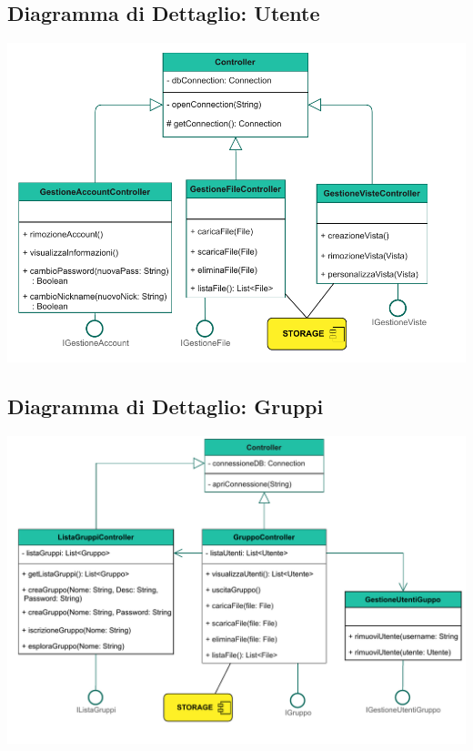 \subsection*{Diagramma di Dettaglio: Utente}
{}
\vspace{0.5cm}
\begin{adjustwidth}{-1cm}{0cm}
\includegraphics[scale=1]{progettazione/Progettazione-Dettaglio Utente.drawio.pdf}
\end{adjustwidth}
\vspace{0.5cm}

\subsection*{Diagramma di Dettaglio: Gruppi}
\vspace{0.5cm}
{}
\begin{adjustwidth}{-2cm}{0cm}
\includegraphics[scale=0.9]{progettazione/Progettazione-DettaglioGruppi.drawio.pdf}
\end{adjustwidth}
\vspace{0.5cm}


